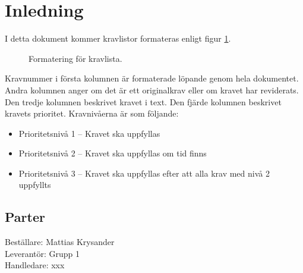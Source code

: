 \documentclass[a4paper,11pt]{article}
\newcommand{\LIPSprojektgrupp}{Grupp 1}
\begin{document}
\pagestyle{intro}
\LIPStitelsida
\clearpage
\begin{LIPSprojektidentitet}
\end{LIPSprojektidentitet}
\clearpage
\renewcommand{\familydefault}{\sfdefault}	%
\normalfont
\tableofcontents
\renewcommand{\familydefault}{\rmdefault}	%
\normalfont
\clearpage
\begin{LIPSdokumenthistorik}
\end{LIPSdokumenthistorik}
\clearpage
\setcounter{page}{1}
\pagestyle{content}
\section{Inledning}


I detta dokument kommer kravlistor formateras enligt figur \ref{fig:lipskrav_exempel}.
\begin{figure}[h!]
\begin{LIPSkravlista}
\end{LIPSkravlista}
\caption{Formatering för kravlista.}
\label{fig:lipskrav_exempel}
\end{figure}

Kravnummer i första kolumnen är formaterade löpande genom hela dokumentet. Andra kolumnen anger om det är ett originalkrav eller om kravet har reviderats. Den tredje kolumnen beskrivet kravet i text. Den fjärde kolumnen beskrivet kravets prioritet. Kravnivåerna är som följande:
\begin{itemize}
	\item Prioritetsnivå 1 – Kravet ska uppfyllas
	\item Prioritetsnivå 2 – Kravet ska uppfyllas om tid finns
	\item Prioritetsnivå 3 – Kravet ska uppfyllas efter att alla krav med nivå 2 uppfyllts 
\end{itemize}
\subsection{Parter}
Beställare: Mattias Krysander \\
Leverantör: \LIPSprojektgrupp \\
Handledare: xxx 
\end{document}
